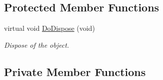 \subsection*{Protected Member Functions}
\begin{DoxyCompactItemize}
\item 
virtual void \hyperlink{classns3_1_1RedQueueDisc_abacb7d43d9b3f20a59b5e4a57c7be8e2}{Do\+Dispose} (void)
\begin{DoxyCompactList}\small\item\em Dispose of the object. \end{DoxyCompactList}\end{DoxyCompactItemize}
\subsection*{Private Member Functions}
